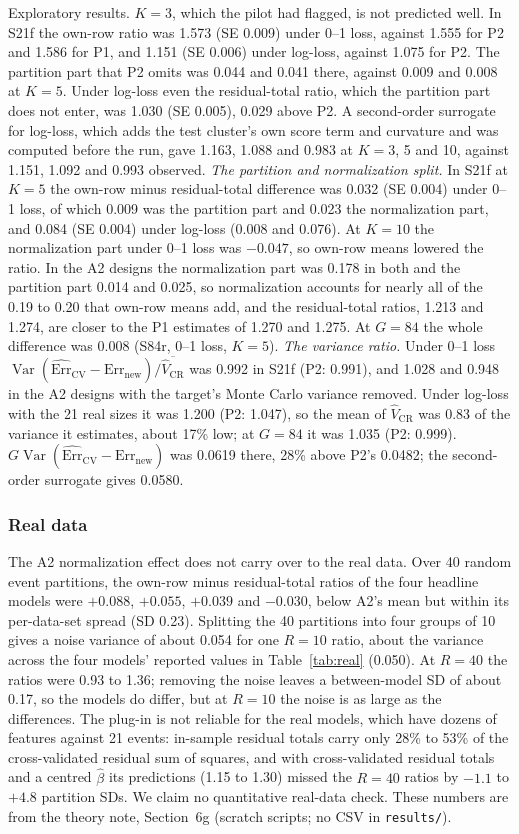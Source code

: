 \documentclass[11pt]{amsart}
\theoremstyle{plain}
\theoremstyle{definition}
\theoremstyle{remark}
\newcommand{\Var}{\operatorname{Var}}
\newcommand{\CV}{\widehat{\mathrm{Err}}_{\mathrm{CV}}}
\newcommand{\Errnew}{\mathrm{Err}_{\mathrm{new}}}
\newcommand{\VCR}{\hat V_{\mathrm{CR}}}
\begin{document}
Exploratory results. \emph{$K=3$}, which the pilot had flagged, is not predicted well. In S21f the own-row ratio was 1.573 (SE 0.009) under 0--1 loss, against 1.555 for P2 and 1.586 for P1, and 1.151 (SE 0.006) under log-loss, against 1.075 for P2. The partition part that P2 omits was 0.044 and 0.041 there, against 0.009 and 0.008 at $K=5$. Under log-loss even the residual-total ratio, which the partition part does not enter, was 1.030 (SE 0.005), 0.029 above P2. A second-order surrogate for log-loss, which adds the test cluster's own score term and curvature and was computed before the run, gave 1.163, 1.088 and 0.983 at $K=3$, 5 and 10, against 1.151, 1.092 and 0.993 observed. \emph{The partition and normalization split.} In S21f at $K=5$ the own-row minus residual-total difference was 0.032 (SE 0.004) under 0--1 loss, of which 0.009 was the partition part and 0.023 the normalization part, and 0.084 (SE 0.004) under log-loss (0.008 and 0.076). At $K=10$ the normalization part under 0--1 loss was $-0.047$, so own-row means lowered the ratio. In the A2 designs the normalization part was 0.178 in both and the partition part 0.014 and 0.025, so normalization accounts for nearly all of the 0.19 to 0.20 that own-row means add, and the residual-total ratios, 1.213 and 1.274, are closer to the P1 estimates of 1.270 and 1.275. At $G=84$ the whole difference was 0.008 (S84r, 0--1 loss, $K=5$). \emph{The variance ratio.} Under 0--1 loss $\Var(\CV-\Errnew)/\overline{\VCR}$ was 0.992 in S21f (P2: 0.991), and 1.028 and 0.948 in the A2 designs with the target's Monte Carlo variance removed. Under log-loss with the 21 real sizes it was 1.200 (P2: 1.047), so the mean of $\VCR$ was 0.83 of the variance it estimates, about 17\% low; at $G=84$ it was 1.035 (P2: 0.999). $G\Var(\CV-\Errnew)$ was 0.0619 there, 28\% above P2's 0.0482; the second-order surrogate gives 0.0580.

\subsubsection*{Real data} The A2 normalization effect does not carry over to the real data. Over 40 random event partitions, the own-row minus residual-total ratios of the four headline models were $+0.088$, $+0.055$, $+0.039$ and $-0.030$, below A2's mean but within its per-data-set spread (SD 0.23). Splitting the 40 partitions into four groups of 10 gives a noise variance of about 0.054 for one $R=10$ ratio, about the variance across the four models' reported values in Table~\ref{tab:real} (0.050). At $R=40$ the ratios were 0.93 to 1.36; removing the noise leaves a between-model SD of about 0.17, so the models do differ, but at $R=10$ the noise is as large as the differences. The plug-in is not reliable for the real models, which have dozens of features against 21 events: in-sample residual totals carry only 28\% to 53\% of the cross-validated residual sum of squares, and with cross-validated residual totals and a centred $\hat\beta$ its predictions (1.15 to 1.30) missed the $R=40$ ratios by $-1.1$ to $+4.8$ partition SDs. We claim no quantitative real-data check. These numbers are from the theory note, Section~6g (scratch scripts; no CSV in \texttt{results/}).
\end{document}
